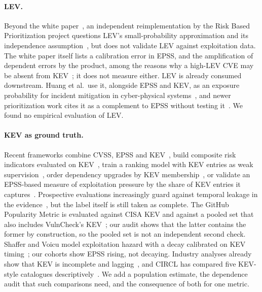 \paragraph{LEV.} Beyond the white paper~\cite{mell2025lev}, an independent
reimplementation by the Risk Based Prioritization project questions LEV's
small-probability approximation and its independence
assumption~\cite{rbp2025lev}, but does not validate LEV against exploitation
data. The white paper itself lists a calibration error in EPSS, and the
amplification of dependent errors by the product, among the reasons why a
high-LEV CVE may be absent from KEV~\cite[Sec.~8]{mell2025lev}; it does not
measure either. LEV is already consumed downstream. Huang et al.\ use it, alongside EPSS
and KEV, as an exposure probability for incident mitigation in cyber-physical
systems~\cite{huang2026cps}, and newer prioritization work cites it as a
complement to EPSS without testing it~\cite{akhoundali2026gpm}. We found no
empirical evaluation of LEV.

\paragraph{KEV as ground truth.} Recent frameworks combine CVSS, EPSS and
KEV~\cite{shimizu2026chaining,podder2026cape}, build composite risk indicators
evaluated on KEV~\cite{sherif2026kri}, train a ranking model with KEV entries as
weak supervision~\cite{motamedi2026threatlens}, order dependency upgrades by
KEV membership~\cite{omondi2026kevgraph}, or validate an EPSS-based measure of
exploitation pressure by the share of KEV entries it captures~\cite{almarashi2026entropy}. Prospective evaluations increasingly
guard against temporal leakage in the evidence~\cite{alpay2026graphs}, but the
label itself is still taken as complete. The GitHub Popularity Metric is
evaluated against CISA KEV and against a pooled set that also includes
VulnCheck's KEV~\cite{akhoundali2026gpm}; our audit shows that the latter
contains the former by construction, so the pooled set is not an independent
second check. Shaffer and Voicu model exploitation hazard with a decay
calibrated on KEV timing~\cite{shaffer2026hazard}; our cohorts show EPSS
rising, not decaying. Industry analyses already show that KEV is incomplete and
lagging~\cite{roytman2026kevparadox,garrity2026state,beardsley2025kevology}, and
CIRCL has compared five KEV-style catalogues
descriptively~\cite{circl2026kevcatalogs}. We add a population estimate, the
dependence audit that such comparisons need, and the consequence of both for
one metric.


